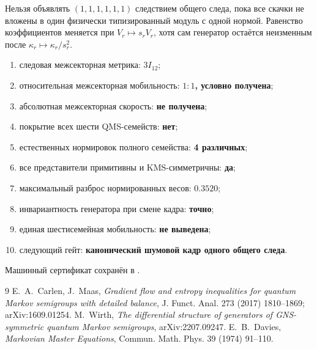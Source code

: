 \begin{nogocriterion}
Нельзя объявлять $(1,1,1,1,1,1)$ следствием общего следа, пока все скачки не
вложены в один физически типизированный модуль с одной нормой. Равенство
коэффициентов меняется при $V_r\mapsto s_rV_r$, хотя сам генератор остаётся
неизменным после $\kappa_r\mapsto\kappa_r/s_r^2$.
\end{nogocriterion}

\begin{protocol}
\begin{enumerate}
 \item следовая межсекторная метрика: \textbf{$3I_{12}$};
 \item относительная межсекторная мобильность: \textbf{$1:1$, условно получена};
 \item абсолютная межсекторная скорость: \textbf{не получена};
 \item покрытие всех шести QMS-семейств: \textbf{нет};
 \item естественных нормировок полного семейства: \textbf{4 различных};
 \item все представители примитивны и KMS-симметричны: \textbf{да};
 \item максимальный разброс нормированных весов: \textbf{$0.3520$};
 \item инвариантность генератора при смене кадра: \textbf{точно};
 \item единая шестисемейная мобильность: \textbf{не выведена};
 \item следующий гейт: \textbf{канонический шумовой кадр одного общего следа}.
\end{enumerate}
\end{protocol}

Машинный сертификат сохранён в
.

\begin{thebibliography}{9}
E.~A.~Carlen, J.~Maas,
\emph{Gradient flow and entropy inequalities for quantum Markov semigroups
with detailed balance}, J. Funct. Anal. 273 (2017) 1810--1869;
arXiv:1609.01254.
M.~Wirth,
\emph{The differential structure of generators of GNS-symmetric quantum
Markov semigroups}, arXiv:2207.09247.
E.~B.~Davies,
\emph{Markovian Master Equations}, Commun. Math. Phys. 39 (1974) 91--110.
\end{thebibliography}